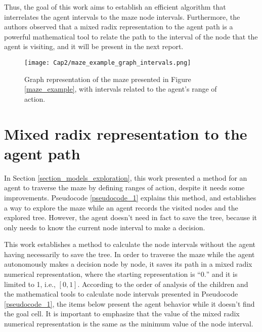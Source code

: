 Thus, the goal of this work aims to establish an efficient algorithm that interrelates the agent intervals to the maze node intervals. Furthermore, the authors observed that a mixed radix representation to the agent path is a powerful mathematical tool to relate the path to the interval of the node that the agent is visiting, and it will be present in the next report.

\begin{figure}[ht!]
\centering
\texttt{[image: Cap2/maze\_example\_graph\_intervals.png]}
\caption{Graph representation of the maze presented in Figure \ref{maze_example}, with intervals related to the agent's range of action.}
\label{maze_example_graph_intervals}
\end{figure}	

\section{Mixed radix representation to the agent path}
\label{section_models_mixed_radix}
In Section \ref{section_models_exploration}, this work presented a method for an agent to traverse the maze by defining ranges of action, despite it needs some improvements. Pseudocode \ref{pseudocode_1} explains this method, and establishes a way to explore the maze while an agent records the visited nodes and the explored tree. However, the agent doesn't need in fact to save the tree, because it only needs to know the current node interval to make a decision.

This work establishes a method to calculate the node intervals without the agent having necessarily to save the tree. In order to traverse the maze while the agent autonomously makes a decision node by node, it saves its path in a mixed radix numerical representation, where the starting representation is ``$0.$'' and it is limited to 1, i.e., $[0,1]$. According to the order of analysis of the children and the mathematical tools to calculate node intervals presented in Pseudocode \ref{pseudocode_1}, the items below present the agent behavior while it doesn't find the goal cell. It is important to emphasize that the value of the mixed radix numerical representation is the same as the minimum value of the node interval.

